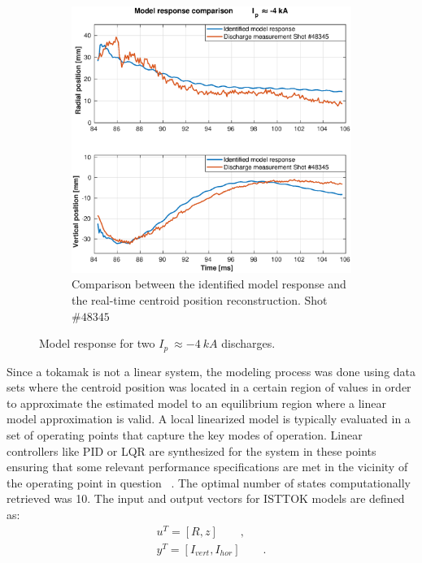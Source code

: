 \begin{figure}
\begin{subfigure}[b]{0.55\textwidth}
		\includegraphics[width=\textwidth]{Chp5/SimResp_345.eps}        
		\caption{ Comparison between the  identified model response and the real-time centroid position reconstruction. Shot $\#48345 $ \label{SimResp345}}
	\end{subfigure}
	\caption{ Model response for two $I_p~\approx -4~kA$ discharges. \label{SimResp_neg}}
\end{figure}

Since a tokamak is not a linear system, the modeling process was done using data sets where the centroid position was located in a certain region of values in order to approximate the estimated  model to an equilibrium region where a linear model approximation is valid. A local linearized model is typically evaluated in a  set of operating points that capture the key modes of operation. Linear controllers like PID  or LQR  are synthesized for the system in these points ensuring that some relevant performance specifications are met in the vicinity of the operating point in question ~\cite{Bendtsen2005}. The optimal number of states computationally retrieved was  10. The input and output vectors for ISTTOK models are defined as:
\begin{equation}
\begin{aligned}
u^T=[R, z]\qquad, \\
y^T=[I_{vert},I_{hor}]\qquad .
\end{aligned} 
\end{equation}



